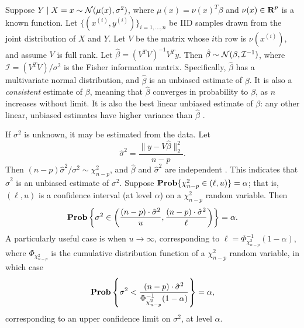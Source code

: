 \documentclass[12pt]{article}
\begin{document}
Suppose $Y \; | \; X = x \sim {\mathcal N} (\mu(x), \sigma^2)$, where $\mu(x) = \nu(x)^T \beta$ and $\nu(x) \in {\mbox{\bf R}}^p$ is a known function. Let $\{ (x^{(i)}, y^{(i)}) \}_{i=1, \ldots, n}$ be IID samples drawn from the joint distribution of $X$ and $Y$. Let $V$ be the matrix whose $i$th row is $\nu(x^{(i)})$, and assume $V$ is full rank. Let $\hat{\beta} = (V^T V)^{-1} V^T y$. Then $\hat{\beta} \sim {\mathcal N} (\beta, \mathcal{I}^{-1})$, where $\mathcal{I} = (V^T V) / \sigma^2$ is the Fisher information matrix.
Specifically, $\hat{\beta}$ has a multivariate normal distribution, and $\hat{\beta}$ is an unbiased estimate of $\beta$. It is also a \textit{consistent} estimate of $\beta$, meaning that $\hat{\beta}$ converges in probability to $\beta$, as $n$ increases without limit. It is also the best linear unbiased estimate of $\beta$: any other linear, unbiased estimates have higher variance than $\hat{\beta}$ \cite[\S~1.3.9]{Wood:2017}.

If $\sigma^2$ is unknown, it may be estimated from the data. Let
\begin{equation}
   \hat{\sigma}^2 = \frac{\| y - V \hat{\beta} \|_2^2}{n-p}.
\end{equation}
Then $(n-p) \hat{\sigma}^2 / \sigma^2 \sim \chi_{n-p}^2$, and $\hat{\beta}$ and $\hat{\sigma}^2$ are independent \cite[\S~3.4.4]{Weisberg:2005}. This indicates that $\hat{\sigma}^2$ is an unbiased estimate of $\sigma^2$. Suppose $\mathop{\bf Prob}\{ \chi_{n-p}^2 \in (\ell, u) \} = \alpha$; that is, $(\ell, u)$ is a confidence interval (at level $\alpha$) on a $\chi_{n-p}^2$ random variable. Then 
\begin{equation}
   \mathop{\bf Prob} \left\{ \sigma^2 \in \left( \frac{(n-p) \cdot \hat{\sigma}^2}{u}, \frac{(n-p) \cdot \hat{\sigma}^2}{\ell} \right) \right\} = \alpha.
\end{equation}
A particularly useful case is when $u \to \infty$, corresponding to $\ell = \Phi_{\chi_{n-p}^2}^{-1}(1 - \alpha)$, where $\Phi_{\chi_{n-p}^2}$ is the cumulative distribution function of a $\chi_{n-p}^2$ random variable, in which case 
\begin{displaymath}
   \mathop{\bf Prob}\left\{\sigma^2 < \frac{(n-p) \cdot \hat{\sigma}^2}{\Phi_{\chi_{n-p}^2}^{-1}(1 - \alpha)} \right\} = \alpha,
\end{displaymath}
corresponding to an upper confidence limit on $\sigma^2$, at level $\alpha$.
\end{document}
